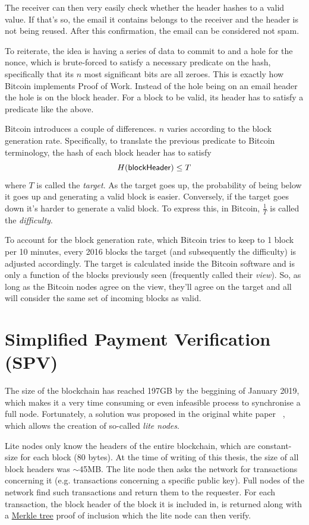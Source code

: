 The receiver can then very easily check whether the header hashes to a valid value. If that's so, the email it contains belongs to the receiver and the header is not being reused. After this confirmation, the email can be considered not spam.

To reiterate, the idea is having a series of data to commit to and a hole for the nonce, which is brute-forced to satisfy a necessary predicate on the hash, specifically that its $n$ most significant bits are all zeroes. This is exactly how Bitcoin implements Proof of Work. Instead of the hole being on an email header the hole is on the block header. For a block to be valid, its header has to satisfy a predicate like the above.

Bitcoin introduces a couple of differences. $n$ varies according to the block generation rate. Specifically, to translate the previous predicate to Bitcoin terminology, the hash of each block header has to satisfy \begin{equation} \label{eq:PoW}
  H({\sf blockHeader}) \le T
\end{equation}
where $T$ is called the \emph{target}. As the target goes up, the probability of being below it goes up and generating a valid block is easier. Conversely, if the target goes down it's harder to generate a valid block. To express this, in Bitcoin, $\frac{1}{T}$ is called the \emph{difficulty}.

To account for the block generation rate, which Bitcoin tries to keep to 1 block per 10 minutes, every 2016 blocks the target (and subsequently the difficulty) is adjusted accordingly. The target is calculated inside the Bitcoin software and is only a function of the blocks previously seen (frequently called their \emph{view}). So, as long as the Bitcoin nodes agree on the view, they'll agree on the target and all will consider the same set of incoming blocks as valid.

\section{Simplified Payment Verification (SPV)}
The size of the blockchain has reached 197GB by the beggining of January 2019, which makes it a very time consuming or even infeasible process to synchronise a full node. Fortunately, a solution was proposed in the original white paper ~\cite{Nakamoto_bitcoin:a}, which allows the creation of so-called \emph{lite nodes}.

Lite nodes only know the headers of the entire blockchain, which are constant-size for each block (80 bytes). At the time of writing of this thesis, the size of all block headers was $\sim$45MB. The lite node then asks the network for transactions concerning it (e.g. transactions concerning a specific public key). Full nodes of the network find such transactions and return them to the requester. For each transaction, the block header of the block it is included in, is returned along with a \hyperref[sec:merkle-trees]{Merkle tree} proof of inclusion which the lite node can then verify.

